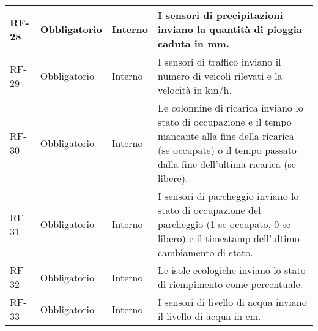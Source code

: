 \begin{longtable}{|>{\centering\arraybackslash}m{}|>{\centering\arraybackslash}m{}|>{\centering\arraybackslash}m{}|>{\centering\arraybackslash}m{}|}
	RF-28           & Obbligatorio        & Interno        & I sensori di precipitazioni inviano la quantità di pioggia caduta in mm.                                                                                                                                                                                                                                                                                                         \\\hline
	RF-29           & Obbligatorio        & Interno        & I sensori di traffico inviano il numero di veicoli rilevati e la velocità in km/h.                                                                                                                                                                                                                                                                                               \\\hline
	RF-30           & Obbligatorio        & Interno        & Le colonnine di ricarica inviano lo stato di occupazione e il tempo mancante alla fine della ricarica (se occupate) o il tempo passato dalla fine dell'ultima ricarica (se libere).                                                                                                                                                                                              \\\hline
	RF-31           & Obbligatorio        & Interno        & I sensori di parcheggio inviano lo stato di occupazione del parcheggio (1 se occupato, 0 se libero) e il timestamp dell'ultimo cambiamento di stato.                                                                                                                                                                                                                             \\\hline
	RF-32           & Obbligatorio        & Interno        & Le isole ecologiche inviano lo stato di riempimento come percentuale.                                                                                                                                                                                                                                                                                                            \\\hline
	RF-33           & Obbligatorio        & Interno        & I sensori di livello di acqua inviano il livello di acqua in cm.                                                                                                                                                                                                                                                                                                                 \\\hline

\end{longtable}
